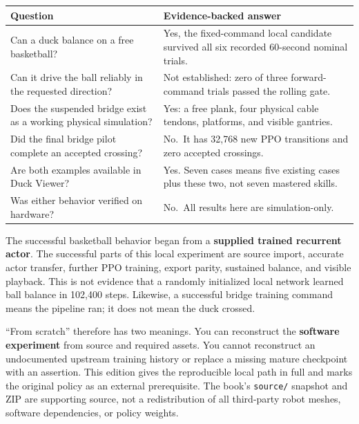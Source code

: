 \documentclass[
  american,
  11pt,
  letterpaper,
]{article}
\newcounter{none} %
\begin{document}
{\def\LTcaptype{none} %
\begin{longtable}[]{@{}
  >{\raggedright\arraybackslash}p{}
  >{\raggedright\arraybackslash}p{}@{}}
\toprule\noalign{}
\begin{minipage}[b]{\linewidth}\raggedright
Question
\end{minipage} & \begin{minipage}[b]{\linewidth}\raggedright
Evidence-backed answer
\end{minipage} \\
\midrule\noalign{}
\endhead
\bottomrule\noalign{}
\endlastfoot
Can a duck balance on a free basketball? & Yes, the fixed-command local
candidate survived all six recorded 60-second nominal trials. \\
Can it drive the ball reliably in the requested direction? & Not
established: zero of three forward-command trials passed the rolling
gate. \\
Does the suspended bridge exist as a working physical simulation? & Yes:
a free plank, four physical cable tendons, platforms, and visible
gantries. \\
Did the final bridge pilot complete an accepted crossing? & No.~It has
32,768 new PPO transitions and zero accepted crossings. \\
Are both examples available in Duck Viewer? & Yes. Seven cases means
five existing cases plus these two, not seven mastered skills. \\
Was either behavior verified on hardware? & No.~All results here are
simulation-only. \\
\end{longtable}
}

The successful basketball behavior began from a \textbf{supplied trained
recurrent actor}. The successful parts of this local experiment are
source import, accurate actor transfer, further PPO training, export
parity, sustained balance, and visible playback. This is not evidence
that a randomly initialized local network learned ball balance in
102,400 steps. Likewise, a successful bridge training command means the
pipeline ran; it does not mean the duck crossed.

``From scratch'' therefore has two meanings. You can reconstruct the
\textbf{software experiment} from source and required assets. You cannot
reconstruct an undocumented upstream training history or replace a
missing mature checkpoint with an assertion. This edition gives the
reproducible local path in full and marks the original policy as an
external prerequisite. The book's \texttt{source/} snapshot and ZIP are
supporting source, not a redistribution of all third-party robot meshes,
software dependencies, or policy weights.
\end{document}
